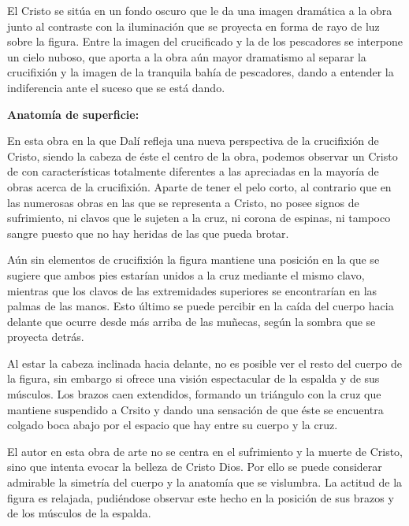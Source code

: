 El Cristo se sitúa en un fondo oscuro que le da una imagen dramática a la obra junto al contraste con la iluminación que se proyecta en forma de rayo de luz sobre la figura. Entre la imagen del crucificado y la de los pescadores se interpone un cielo nuboso, que aporta a la obra aún mayor dramatismo al separar la crucifixión y la imagen de la tranquila bahía de pescadores, dando a entender la indiferencia ante el suceso que se está dando.


\vspace{12pt}
\textbf{Anatomía de superficie:}

En esta obra en la que Dalí refleja una nueva perspectiva de la crucifixión de Cristo, siendo la cabeza de éste el centro de la obra, podemos observar un Cristo de con características totalmente diferentes a las apreciadas en la mayoría de obras acerca de la crucifixión. Aparte de tener el pelo corto, al contrario que en las numerosas obras en las que se representa a Cristo, no posee signos de sufrimiento, ni clavos que le sujeten a la cruz, ni corona de espinas, ni tampoco sangre puesto que no hay heridas de las que pueda brotar.

Aún sin elementos de crucifixión la figura mantiene una posición en la que se sugiere que ambos pies estarían unidos a la cruz mediante el mismo clavo, mientras que los clavos de las extremidades superiores se encontrarían en las palmas de las manos. Esto último se puede percibir en la caída del cuerpo hacia delante que ocurre desde más arriba de las muñecas, según la sombra que se proyecta detrás.

Al estar la cabeza inclinada hacia delante, no es posible ver el resto del cuerpo de la figura, sin embargo si ofrece una visión espectacular de la espalda y de sus músculos. Los brazos caen extendidos, formando un triángulo con la cruz que mantiene suspendido a Crsito y dando una sensación de que éste se encuentra colgado boca abajo por el espacio que hay entre su cuerpo y la cruz.

El autor en esta obra de arte no se centra en el sufrimiento y la muerte de Cristo, sino que intenta evocar la belleza de Cristo Dios. Por ello se puede considerar admirable la simetría del cuerpo y la anatomía que se vislumbra. La actitud de la figura es relajada, pudiéndose observar este hecho en la posición de sus brazos y de los músculos de la espalda.

